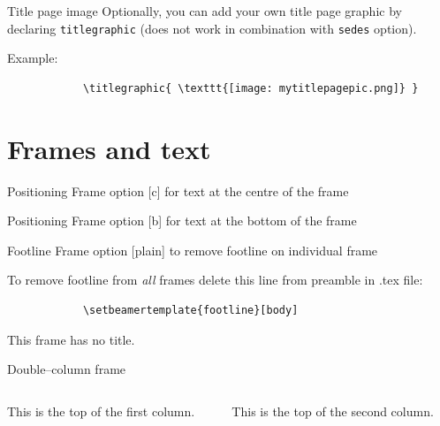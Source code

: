\documentclass[11pt,t]{beamer}
\begin{document}
	\begin{frame}[fragile]{Title page image}
		Optionally, you can add your own title page graphic by declaring \texttt{titlegraphic} (does not work in combination with \texttt{sedes} option).

		\vspace{24pt}
		Example:
		\begin{verbatim}
			\titlegraphic{ \texttt{[image: mytitlepagepic.png]} }
		\end{verbatim}
	\end{frame}







	\section{Frames and text}
	\begin{frame}[c]{Positioning}
		Frame option [c] for text at the centre of the frame
	\end{frame}




	\begin{frame}[b]{Positioning}
		Frame option [b] for text at the bottom of the frame
		\vspace{8mm} %
	\end{frame}




	\begin{frame}{Footline}   %
		\vspace{2.1mm} %
		Frame option [plain] to remove footline on individual frame

		\vspace{25pt}
		To remove footline from \emph{all} frames delete this line from preamble in .tex file:
		\begin{verbatim}
			\setbeamertemplate{footline}[body]
		\end{verbatim}
	\end{frame}




	\begin{frame}
		This frame has no title.
	\end{frame}




	\begin{frame}{Double--column frame}
		\begin{columns}[t]
			\begin{column}{.5\textwidth}
				This is the top of the first column.
			\end{column}
			\begin{column}{.5\textwidth}
				This is the top of the second column.
			\end{column}
		\end{columns}
	\end{frame}
\end{document}
